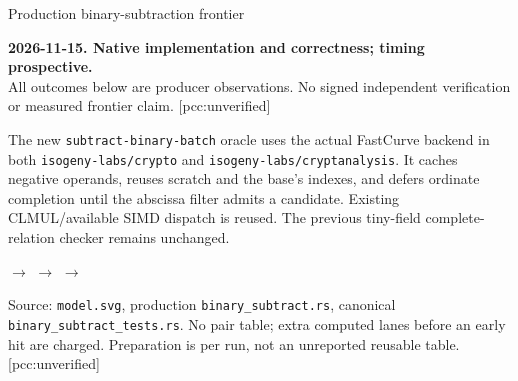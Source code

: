 \documentclass[10pt]{article}
\begin{document}
\begin{center}\LARGE Production binary-subtraction frontier\end{center}
\textbf{2026-11-15. Native implementation and correctness; timing prospective.}\\
All outcomes below are producer observations. No signed independent verification or measured frontier claim. [pcc:unverified]

The new \texttt{subtract-binary-batch} oracle uses the actual FastCurve backend in both \texttt{isogeny-labs/crypto} and \texttt{isogeny-labs/cryptanalysis}. It caches negative operands, reuses scratch and the base's indexes, and defers ordinate completion until the abscissa filter admits a candidate. Existing CLMUL/available SIMD dispatch is reused. The previous tiny-field complete-relation checker remains unchanged.

\begin{center}
$\to$
$\to$
$\to$
\end{center}
Source: \texttt{model.svg}, production \texttt{binary\_subtract.rs}, canonical \texttt{binary\_subtract\_tests.rs}. No pair table; extra computed lanes before an early hit are charged. Preparation is per run, not an unreported reusable table. [pcc:unverified]
\end{document}
